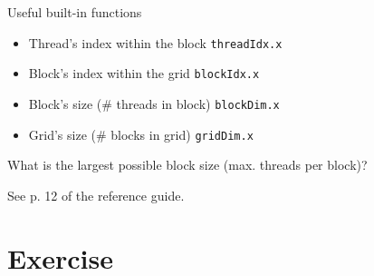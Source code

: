 \documentclass[11pt,t]{beamer}
\newcommand{\inline}[1]{ \colorbox{mygray}{\lstinline{#1}}}
\begin{document}
\begin{frame}{Useful built-in functions} 

\vspace{0.75 em}

\begin{itemize}
    \setlength\itemsep{0.5 em}
    \item Thread's index within the block \inline{threadIdx.x}
    \item Block's index within the grid \inline{blockIdx.x}
    \item Block's size (\# threads in block) \inline{blockDim.x}
    \item Grid's size  (\# blocks in grid)\inline{gridDim.x}
\end{itemize}

\vspace{1cm}

What is the largest possible block size (max. threads per block)?

See p. 12 of the reference guide.

\end{frame}




\section{Exercise}
\end{document}
